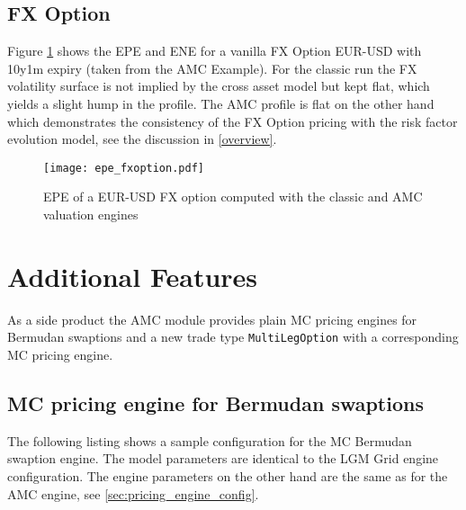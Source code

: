 \documentclass[12pt, a4paper]{article}
\begin{document}
\subsection{FX Option}

Figure \ref{epe_fxoption} shows the EPE and ENE for a vanilla FX Option EUR-USD with 10y1m expiry (taken from the AMC
Example). For the classic run the FX volatility surface is not implied by the cross asset model but kept flat, which
yields a slight hump in the profile. The AMC profile is flat on the other hand which demonstrates the consistency of the
FX Option pricing with the risk factor evolution model, see the discussion in \ref{overview}.

\begin{figure}
  \texttt{[image: epe\_fxoption.pdf]}
  \caption{EPE of a EUR-USD FX option computed with the classic and AMC valuation engines}
  \label{epe_fxoption}
\end{figure}

\section{Additional Features}\label{sec:side_products}

As a side product the AMC module provides plain MC pricing engines for Bermudan swaptions and a new trade type
\verb+MultiLegOption+ with a corresponding MC pricing engine.

\subsection{MC pricing engine for Bermudan swaptions}\label{sec:mc_bermudan_engine}

The following listing shows a sample configuration for the MC Bermudan swaption engine. The model parameters are
identical to the LGM Grid engine configuration. The engine parameters on the other hand are the same as for the AMC
engine, see \ref{sec:pricing_engine_config}.
\end{document}
